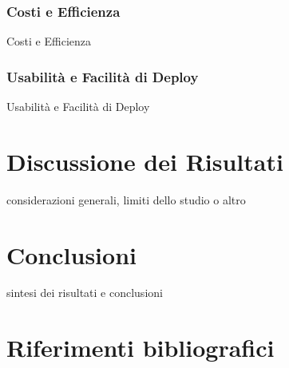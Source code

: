 \documentclass[12pt,a4paper,twoside]{book}
\begin{document}
\subsection{Costi e Efficienza}
Costi e Efficienza

\subsection{Usabilità e Facilità di Deploy}
Usabilità e Facilità di Deploy

\chapter{Discussione dei Risultati}
considerazioni generali, limiti dello studio o altro

\chapter{Conclusioni}
sintesi dei risultati e conclusioni

\renewcommand{\bibsection}{}
\chapter*{Riferimenti bibliografici}

\end{document}
